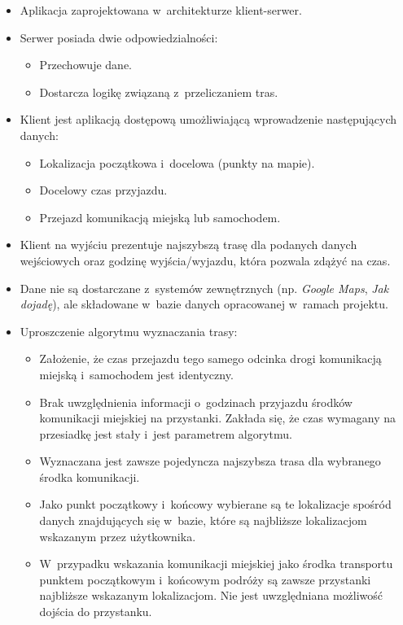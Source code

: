 \documentclass[a4paper,12pt]{article}
\begin{document}
	\begin{itemize}
		\item Aplikacja zaprojektowana w~architekturze klient-serwer.
		\item Serwer posiada dwie odpowiedzialności:
		\begin{itemize}
			\item Przechowuje dane.
			\item Dostarcza logikę związaną z~przeliczaniem tras.
		\end{itemize}
		\item Klient jest aplikacją dostępową umożliwiającą wprowadzenie następujących danych:
		\begin{itemize}
			\item Lokalizacja początkowa i~docelowa (punkty na mapie).
			\item Docelowy czas przyjazdu.
			\item Przejazd komunikacją miejską lub samochodem.
		\end{itemize}
		\item Klient na wyjściu prezentuje najszybszą trasę dla podanych danych wejściowych oraz godzinę wyjścia/wyjazdu, która pozwala zdążyć na czas.
		\item Dane nie są dostarczane z~systemów zewnętrznych (np. \emph{Google Maps}, \emph{Jak dojadę}), ale składowane w~bazie danych opracowanej w~ramach projektu.
		\item Uproszczenie algorytmu wyznaczania trasy:
		\begin{itemize}
			\item Założenie, że czas przejazdu tego samego odcinka drogi komunikacją miejską i~samochodem jest identyczny.
			\item Brak uwzględnienia informacji o~godzinach przyjazdu środków komunikacji miejskiej na przystanki. Zakłada się, że czas wymagany na przesiadkę jest stały i~jest parametrem algorytmu.
			\item Wyznaczana jest zawsze pojedyncza najszybsza trasa dla wybranego środka komunikacji.
			\item Jako punkt początkowy i~końcowy wybierane są te lokalizacje spośród danych znajdujących się w~bazie, które są najbliższe lokalizacjom wskazanym przez użytkownika.
			\item W~przypadku wskazania komunikacji miejskiej jako środka transportu punktem początkowym i~końcowym podróży są zawsze przystanki najbliższe wskazanym lokalizacjom. Nie jest uwzględniana możliwość dojścia do przystanku.
		\end{itemize}
	\end{itemize}
\end{document}

